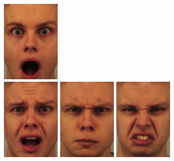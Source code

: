 \documentclass[a4paper]{article}
\begin{document}
\begin{figure}
\begin{center}
\begin{subfigure}{0.18\textwidth}
      \includegraphics[width=0.32\textwidth]{figures/AM05SUS.JPG}\\
      \includegraphics[width=0.32\textwidth]{figures/AM05AFS.JPG}%
      \includegraphics[width=0.32\textwidth]{figures/AM05ANS.JPG}%
      \includegraphics[width=0.32\textwidth]{figures/AM05DIS.JPG}\\

\end{subfigure}
\end{center}
\end{figure}
\end{document}
